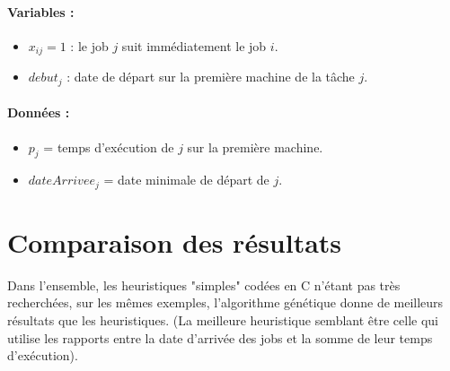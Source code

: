 \documentclass[11pt]{article} %
\let\stdpart\part
\renewcommand\part{\newpage\setcounter{section}{0}\stdpart}
\begin{document}
\paragraph{Variables :}

\begin{itemize}
	\item $x_{ij} = 1$ : le job $j$ suit immédiatement le job $i$.
	\item $debut_j$ : date de départ sur la première machine de la tâche $j$.
\end{itemize}

\paragraph{Données :}

\begin{itemize}
	\item $p_j$ = temps d'exécution de $j$ sur la première machine.
	\item $dateArrivee_j$ = date minimale de départ de $j$.
\end{itemize}

\section{Comparaison des résultats}

Dans l'ensemble, les heuristiques "simples" codées en C n'étant pas très recherchées, sur les mêmes exemples, l'algorithme génétique donne de meilleurs résultats que les heuristiques. (La meilleure heuristique semblant être celle qui utilise les rapports entre la date d'arrivée des jobs et la somme de leur temps d'exécution).


\end{document}
